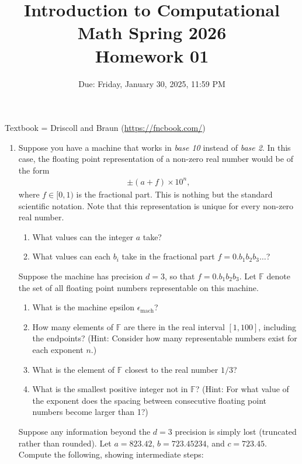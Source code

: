 \documentclass[reqno]{exam}
\title{Introduction to Computational Math Spring 2026 \\ Homework 01}
\date{Due: Friday, January 30, 2025, 11:59 PM}
\author{}
\begin{document}
\maketitle
\thispagestyle{empty}

Textbook = Driscoll and Braun (\url{https://fncbook.com/})

\begin{enumerate}

\item Suppose you have a machine that works in \textit{base 10} instead of \textit{base 2}. In this case, the floating point representation of a non-zero real number would be of the form
\begin{align*}
  \pm(a + f) \times 10^n,
\end{align*}
where $f \in [0, 1)$ is the fractional part. This is nothing but the standard scientific notation. Note that this representation is unique for every non-zero real number.

\begin{enumerate}
  \item What values can the integer $a$ take?
  \item What values can each $b_i$ take in the fractional part $f = 0.b_1 b_2 b_3 \ldots$?
\end{enumerate}

Suppose the machine has precision $d = 3$, so that $f = 0.b_1 b_2 b_3$. Let $\mathbb{F}$ denote the set of all floating point numbers representable on this machine.

\begin{enumerate}[resume]
  \item What is the machine epsilon $\epsilon_{\text{mach}}$?
  \item How many elements of $\mathbb{F}$ are there in the real interval $[1, 100]$, including the endpoints? (Hint: Consider how many representable numbers exist for each exponent $n$.)
  \item What is the element of $\mathbb{F}$ closest to the real number $1/3$? 
  \item What is the smallest positive integer not in $\mathbb{F}$? (Hint: For what value of the exponent does the spacing between consecutive floating point numbers become larger than 1?)
\end{enumerate}

Suppose any information beyond the $d=3$ precision is simply lost (truncated rather than rounded). Let $a = 823.42$, $b = 723.45234$, and $c = 723.45$. Compute the following, showing intermediate steps:


\end{enumerate}
\end{document}
